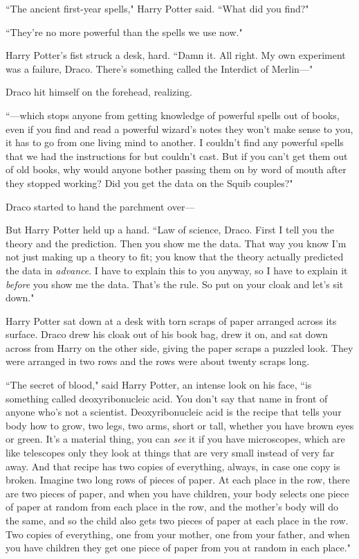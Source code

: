 ``The ancient first-year spells," Harry Potter said. ``What did you find?"

``They're no more powerful than the spells we use now."

Harry Potter's fist struck a desk, hard. ``Damn it. All right. My own experiment was a failure, Draco. There's something called the Interdict of Merlin—"

Draco hit himself on the forehead, realizing.

``—which stops anyone from getting knowledge of powerful spells out of books, even if you find and read a powerful wizard's notes they won't make sense to you, it has to go from one living mind to another. I couldn't find any powerful spells that we had the instructions for but couldn't cast. But if you can't get them out of old books, why would anyone bother passing them on by word of mouth after they stopped working? Did you get the data on the Squib couples?"

Draco started to hand the parchment over—

But Harry Potter held up a hand. ``Law of science, Draco. First I tell you the theory and the prediction. Then you show me the data. That way you know I'm not just making up a theory to fit; you know that the theory actually predicted the data in \emph{advance}. I have to explain this to you anyway, so I have to explain it \emph{before} you show me the data. That's the rule. So put on your cloak and let's sit down."

Harry Potter sat down at a desk with torn scraps of paper arranged across its surface. Draco drew his cloak out of his book bag, drew it on, and sat down across from Harry on the other side, giving the paper scraps a puzzled look. They were arranged in two rows and the rows were about twenty scraps long.

``The secret of blood," said Harry Potter, an intense look on his face, ``is something called deoxyribonucleic acid. You don't say that name in front of anyone who's not a scientist. Deoxyribonucleic acid is the recipe that tells your body how to grow, two legs, two arms, short or tall, whether you have brown eyes or green. It's a material thing, you can \emph{see} it if you have microscopes, which are like telescopes only they look at things that are very small instead of very far away. And that recipe has two copies of everything, always, in case one copy is broken. Imagine two long rows of pieces of paper. At each place in the row, there are two pieces of paper, and when you have children, your body selects one piece of paper at random from each place in the row, and the mother's body will do the same, and so the child also gets two pieces of paper at each place in the row. Two copies of everything, one from your mother, one from your father, and when you have children they get one piece of paper from you at random in each place."

